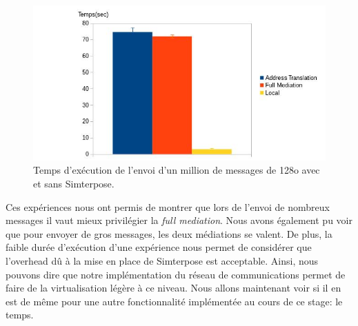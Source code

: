 \begin{figure}
  \centering
    \includegraphics[scale=0.5]{mesures/graph/Littlemsg.jpg}
    \caption{Temps d'exécution de l'envoi d'un million de messages de 128o avec et sans Simterpose.}
    \label{Network_Little}
\end{figure}
  
Ces expériences nous ont permis de montrer que lors de l'envoi de nombreux messages il vaut mieux privilégier la \textit{full mediation}. Nous avons également pu voir que pour envoyer de gros messages, les deux médiations se valent. De plus, la faible durée d'exécution d'une expérience nous permet de considérer que l'overhead dû à la mise en place de Simterpose est acceptable. Ainsi, nous pouvons dire que notre implémentation du réseau de communications permet de faire de la virtualisation légère à ce niveau. Nous allons maintenant voir si il en est de même pour une autre fonctionnalité implémentée au cours de ce stage: le temps.
